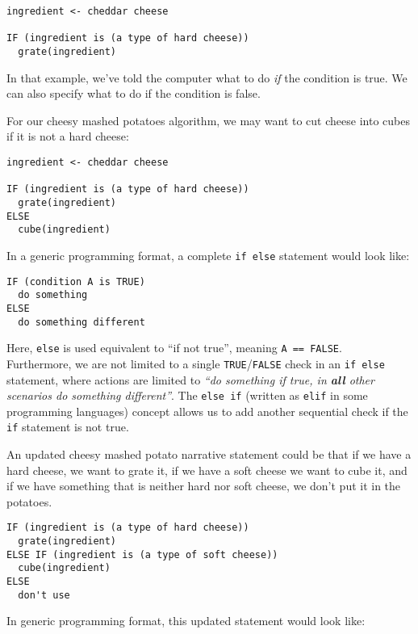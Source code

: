 \documentclass[
]{book}
\begin{document}
\begin{verbatim}
ingredient <- cheddar cheese

IF (ingredient is (a type of hard cheese))
  grate(ingredient)
\end{verbatim}

In that example, we've told the computer what to do \emph{if} the condition is true. We can also specify what to do if the condition is false.

For our cheesy mashed potatoes algorithm, we may want to cut cheese into cubes if it is not a hard cheese:

\begin{verbatim}
ingredient <- cheddar cheese

IF (ingredient is (a type of hard cheese))
  grate(ingredient)
ELSE
  cube(ingredient)
\end{verbatim}

In a generic programming format, a complete \texttt{if\ else} statement would look like:

\begin{verbatim}
IF (condition A is TRUE)
  do something
ELSE 
  do something different
\end{verbatim}

Here, \texttt{else} is used equivalent to ``if not true'', meaning \texttt{A\ ==\ FALSE}.\\

Furthermore, we are not limited to a single \texttt{TRUE}/\texttt{FALSE} check in an \texttt{if\ else} statement, where actions are limited to \emph{``do something if true, in \textbf{all} other scenarios do something different''}. The \texttt{else\ if} (written as \texttt{elif} in some programming languages) concept allows us to add another sequential check if the \texttt{if} statement is not true.

An updated cheesy mashed potato narrative statement could be that if we have a hard cheese, we want to grate it, if we have a soft cheese we want to cube it, and if we have something that is neither hard nor soft cheese, we don't put it in the potatoes.

\begin{verbatim}
IF (ingredient is (a type of hard cheese))
  grate(ingredient)
ELSE IF (ingredient is (a type of soft cheese))
  cube(ingredient)
ELSE
  don't use
\end{verbatim}

In generic programming format, this updated statement would look like:
\end{document}
